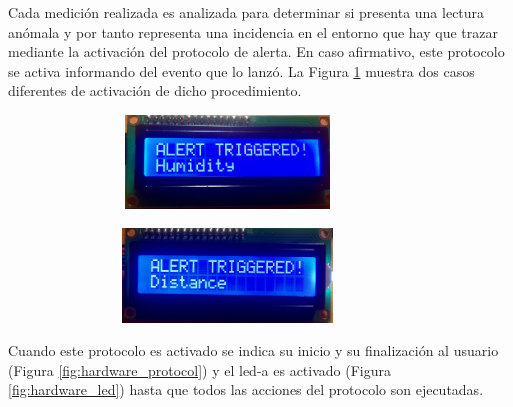 \documentclass[12pt,a4paper, twoside]{report}
\begin{document}
	Cada medición realizada es analizada para determinar si presenta una lectura anómala y por tanto representa una incidencia en el entorno que hay que trazar mediante la activación del protocolo de alerta. En caso afirmativo, este protocolo se activa informando del evento que lo lanzó. La Figura \ref{fig:hardware_alert} muestra dos casos diferentes de activación de dicho procedimiento.
	
	\begin{figure}[!ht]		
		\caption{Prototipo hardware Hyot - Protocolo de alerta activado por humedad y distancia.}
 		\begin{subfigure}{0.5\textwidth}
 			\hbox{
 				\hspace{0cm}
 				\includegraphics[width=7cm, height=2.5cm]{Images/hardware/lcd1_alert} 
 			}
		\end{subfigure}
		\begin{subfigure}{0.5\textwidth}
			\hbox{
 				\hspace{1cm}
				\includegraphics[width=7cm, height=2.5cm]{Images/hardware/lcd2_alert}
			}
		\end{subfigure}
		\label{fig:hardware_alert}
	\end{figure}
	
	Cuando este protocolo es activado se indica su inicio y su finalización al usuario (Figura \ref{fig:hardware_protocol}) y el \gls{led-a} es activado (Figura \ref{fig:hardware_led}) hasta que todos las acciones del protocolo son ejecutadas.
	
\end{document}
